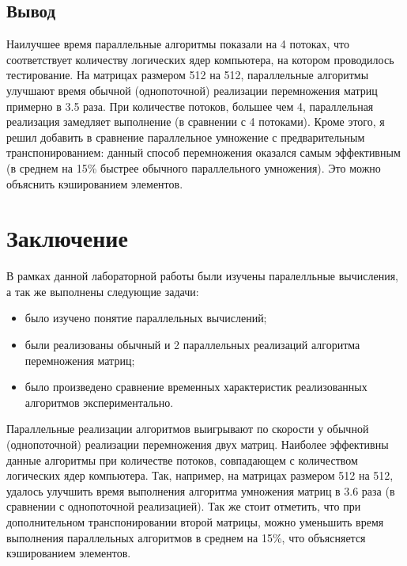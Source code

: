 \documentclass[12pt]{report}
\begin{document}
\section{Вывод}

Наилучшее время параллельные алгоритмы показали на 4 потоках, что соответствует количеству логических ядер компьютера, на котором проводилось тестирование. На матрицах размером 512 на 512, параллельные алгоритмы улучшают время обычной (однопоточной) реализации перемножения матриц примерно в 3.5 раза. При количестве потоков, большее чем 4, параллельная реализация замедляет выполнение (в сравнении с 4 потоками). Кроме этого, я решил добавить в сравнение параллельное умножение с предварительным транспонированием: данный способ перемножения оказался самым эффективным (в среднем на 15\% быстрее обычного параллельного умножения). Это можно объяснить кэшированием элементов.

\chapter*{Заключение}

В рамках данной лабораторной работы были изучены паралелльные вычисления, а так же выполнены следующие задачи:

\begin{itemize}
	\item было изучено понятие параллельных вычислений;
	\item были реализованы обычный и  2 параллельных реализаций алгоритма перемножения матриц;
	\item было произведено сравнение временных характеристик реализованных алгоритмов экспериментально.
\end{itemize}

Параллельные реализации алгоритмов выигрывают по скорости у обычной (однопоточной) реализации перемножения двух матриц. Наиболее эффективны данные алгоритмы при количестве потоков, совпадающем с количеством логических ядер компьютера. Так, например, на матрицах размером 512 на 512, удалось улучшить время выполнения алгоритма умножения матриц в 3.6 раза (в сравнении с однопоточной реализацией). Так же стоит отметить, что при дополнительном транспонировании второй матрицы, можно уменьшить время выполнения параллельных алгоритмов в среднем на 15\%, что объясняется кэшированием элементов.



\end{document}
